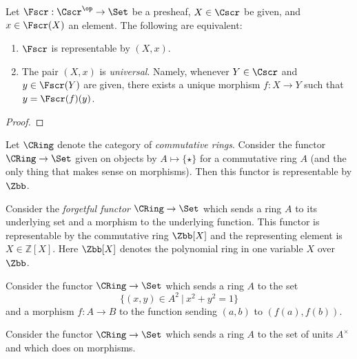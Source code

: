 \begin{theorem}
  Let $\Fscr : \Cscr^{\op} \to \Set$ be a presheaf, $X \in \Cscr$ be given, and $x \in \Fscr(X)$ an element.
  The following are equivalent:
  \begin{enumerate}
    \item $\Fscr$ is representable by $(X,x)$.
    \item The pair $(X,x)$ is \emph{universal}.
          Namely, whenever $Y \in \Cscr$ and $y \in \Fscr(Y)$ are given, there exists a unique morphism $f : X \to Y$ such that $y = \Fscr(f)(y)$.
  \end{enumerate}
\end{theorem}
\begin{proof}
\end{proof}


\begin{example}
  Let $\CRing$ denote the category of \emph{commutative rings}.
  Consider the functor $\CRing \to \Set$ given on objects by $A \mapsto \{\star\}$ for a commutative ring $A$ (and the only thing that makes sense on morphisms).
  Then this functor is representable by $\Zbb$.
\end{example}

\begin{example}
  Consider the \emph{forgetful functor} $\CRing \to \Set$ which sends a ring $A$ to its underlying set and a morphism to the underlying function.
  This functor is representable by the commutative ring $\Zbb[X]$ and the representing element is $X \in \mathbb{Z}[X]$.
  Here $\Zbb[X]$ denotes the polynomial ring in one variable $X$ over $\Zbb$.
\end{example}

\begin{example}
  Consider the functor $\CRing \to \Set$ which sends a ring $A$ to the set
  \[ \{ (x,y) \in A^{2} \ | \ x^{2} + y^{2} = 1 \} \]
  and a morphism $f : A \to B$ to the function sending $(a,b)$ to $(f(a),f(b))$.
\end{example}

\begin{example}
  Consider the functor $\CRing \to \Set$ which sends a ring $A$ to the set of units $A^{\times}$ and which does  on morphisms.
\end{example}

